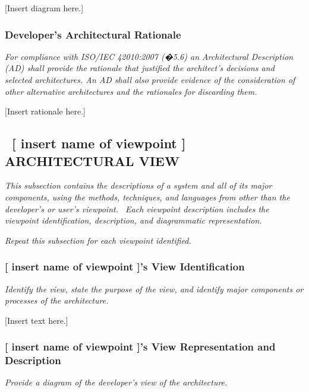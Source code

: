 \documentclass[twoside,letterpaper]{article}
\begin{document}
{\color{black}
[Insert diagram here.]}

\subsubsection{Developer{\textquoteright}s Architectural Rationale}
{\itshape\color{black}
For compliance with ISO/IEC 42010:2007 (�5.6) an Architectural
Description (AD) shall provide the rationale that justified the
architect{\textquoteright}s decisions and selected architectures. An AD
shall also provide evidence of the consideration of other alternative
architectures and the rationales for discarding them.}

{\color{black}
[Insert rationale here.]}

\subsection[\ [ insert name of viewpoint {]} ARCHITECTURAL
VIEW]{\foreignlanguage{english}{\ }\foreignlanguage{english}{[ insert
name of viewpoint ] ARCHITECTURAL VIEW}}
{\itshape\color{black}
This subsection contains the descriptions of a system and all of its
major components, using the methods, techniques, and languages from
other than the developer{\textquoteright}s or user{\textquoteright}s
viewpoint. \ Each viewpoint description includes the viewpoint
identification, description, and diagrammatic representation. }


\bigskip

{\itshape\color{black}
Repeat this subsection for each viewpoint identified.}

\subsubsection{[ insert name of viewpoint ]{\textquoteright}s View
Identification}
{\itshape\color{black}
Identify the view, state the purpose of the view, and identify major
components or processes of the architecture.}

{\color{black}
[Insert text here.]}

\subsubsection{[ insert name of viewpoint ]{\textquoteright}s View
Representation and Description }
{\itshape\color{black}
Provide a diagram of the developer{\textquoteright}s view of the
architecture.}
\end{document}
